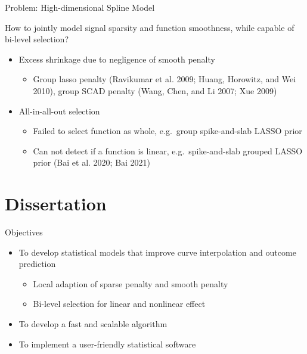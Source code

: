 \documentclass[
  ignorenonframetext,
  aspectratio=169]{beamer}
\providecommand{\tightlist}{%
  \setlength{\itemsep}{0pt}\setlength{\parskip}{0pt}}
\begin{document}
\begin{frame}{Problem: High-dimensional Spline Model}
\protect\hypertarget{problem-high-dimensional-spline-model}{}
\begin{tcolorbox}[colback=green!5,colframe=green!40!black,title=Question]
How to jointly model signal sparsity and function smoothness, while capable of bi-level selection?
\end{tcolorbox}

\begin{itemize}
\tightlist
\item
  Excess shrinkage due to negligence of smooth penalty

  \begin{itemize}
  \tightlist
  \item
    Group lasso penalty (Ravikumar et al. 2009; Huang, Horowitz, and Wei
    2010), group SCAD penalty (Wang, Chen, and Li 2007; Xue 2009)
  \end{itemize}
\item
  All-in-all-out selection

  \begin{itemize}
  \tightlist
  \item
    Failed to select function as whole, e.g.~group spike-and-slab LASSO
    prior
  \item
    Can not detect if a function is linear, e.g.~spike-and-slab grouped
    LASSO prior (Bai et al. 2020; Bai 2021)
  \end{itemize}
\end{itemize}
\end{frame}

\hypertarget{dissertation}{%
\section{Dissertation}\label{dissertation}}

\begin{frame}{Objectives}
\protect\hypertarget{objectives}{}
\begin{itemize}
\tightlist
\item
  To develop statistical models that improve curve interpolation and
  outcome prediction

  \begin{itemize}
  \tightlist
  \item
    Local adaption of sparse penalty and smooth penalty
  \item
    Bi-level selection for linear and nonlinear effect
  \end{itemize}
\item
  To develop a fast and scalable algorithm
\item
  To implement a user-friendly statistical software
\end{itemize}
\end{frame}
\end{document}
